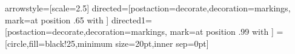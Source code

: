 \usepackage[format=hang,font=bf]{caption}
  
\usepackage{eepic}

\usepackage{multicol}

\usepackage{makeidx} 

\usepackage{graphicx}

\usepackage{epsfig}


\usepackage{afterpage}
\usepackage{pagecolor}

\usepackage{hyperref}

 

\usepackage{tcolorbox}



\usepackage[framemethod=tikz]{mdframed}

\usepackage{emptypage}

\usepackage{rotating}
\usepackage{tikz}
\usetikzlibrary{calc,intersections,shapes.callouts}
\usetikzlibrary{decorations.text}
\usetikzlibrary{positioning}
\usetikzlibrary{decorations.pathreplacing}
\usetikzlibrary{shadows}
\usetikzlibrary{backgrounds}
\usepackage{circuitikz}
\tikzstyle arrowstyle=[scale=2.5]
\tikzstyle directed=[postaction={decorate,decoration={markings,
    mark=at position .65 with {}}}]
\tikzstyle directed1=[postaction={decorate,decoration={markings,
    mark=at position .99 with {}}}]   
=[circle,fill=black!25,minimum size=20pt,inner sep=0pt]


